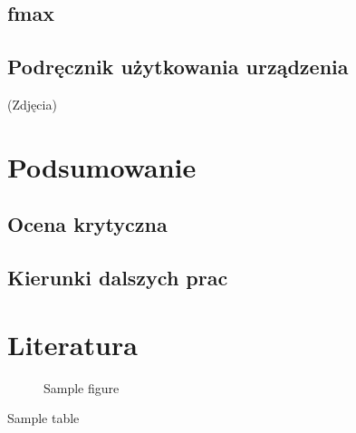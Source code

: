 \documentclass[a4paper]{report}
\begin{document}
	\section{fmax}
	\section{Podręcznik użytkowania urządzenia}
	(Zdjęcia)
	
\chapter{Podsumowanie}
	\section{Ocena krytyczna}	
	\section{Kierunki dalszych prac}
	
\chapter{Literatura}

\begin{figure}
	\caption{Sample figure}
\end{figure}
		
\begin{table}
	\caption{Sample table}
\end{table}

\begin{appendix}
	\listoffigures
	\listoftables
\end{appendix}
\end{document}
